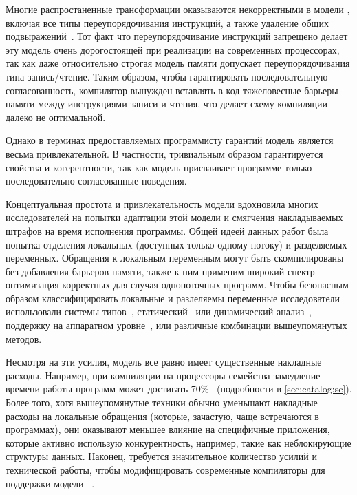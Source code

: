 Многие распростаненные трансформации оказываются 
некорректными в модели \SC, включая 
все типы переупорядочивания инструкций, 
а также удаление общих подвыражений~\cite{Marino-al:PLDI11, Sevcik-Aspinall:ECOOP08}.
Тот факт что переупорядочивание инструкций запрещено 
делает эту модель очень дорогостоящей при реализации
на современных процессорах, так как даже 
относительно строгая модель памяти \Intel
допускает переупорядочивания типа запись/чтение. 
Таким образом, чтобы гарантировать последовательную согласованность, 
компилятор вынужден вставлять в код тяжеловесные 
барьеры памяти между инструкциями записи и чтения,
что делает схему компиляции далеко не оптимальной. 

Однако в терминах предоставляемых программисту гарантий 
модель \SC является весьма привлекательной. 
В частности, тривиальным образом гарантируется свойства \DRF и когерентности, 
так как модель присваивает программе только последовательно согласованные поведения. 

Концептуальная простота и привлекательность модели \SC 
вдохновила многих исследователей на попытки 
адаптации этой модели и смягчения накладываемых 
штрафов на время исполнения программы. 
Общей идеей данных работ была попытка 
отделения локальных (доступных только одному потоку) 
и разделяемых переменных.
Обращения к локальным переменным могут быть скомпилированы 
без добавления барьеров памяти, также к ним 
применим широкий спектр оптимизация корректных 
для случая однопоточных программ. 
Чтобы безопасным образом классифицировать 
локальные и разлеляемы переменные исследователи 
использовали системы типов~\cite{Vollmer-al:PPoPP17},
статический~\cite{Singh-al:ISCA12} или динамический анализ~\cite{Liu-al:PLDI19}, 
поддержку на аппаратном уровне~\cite{Singh-al:ISCA12, Marino-al:PLDI10}, 
или различные комбинации вышеупомянутых методов.  

Несмотря на эти усилия, модель \SC все равно имеет существенные накладные расходы. 
Например, при компиляции на процессоры семейства 
замедление времени работы программ может достигать 70\%~\cite{Liu-al:PLDI19} 
(\see подробности в \cref{sec:catalog:sc}).
Более того, хотя вышеупомянутые техники обычно уменьшают 
накладные расходы на локальные обращения 
(которые, зачастую, чаще встречаются в программах),
они оказывают меньшее влияние на специфичные приложения, 
которые активно использую конкурентность, 
например, такие как неблокирующие структуры данных.
Наконец, требуется значительное количество усилий 
и технической работы, чтобы модифицировать 
современные компиляторы для поддержки модели \SC~\cite{Marino-al:PLDI11, Liu-al:PLDI19}.

